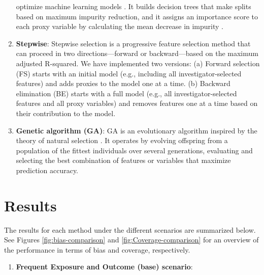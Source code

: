 \documentclass[sn-vancouver,Numbered,lineno,pdflatex]{sn-jnl}
\providecommand{\tightlist}{%
  \setlength{\itemsep}{0pt}\setlength{\parskip}{0pt}}
\begin{document}
\begin{enumerate}
  optimize machine learning models \citep{chen2016xgboost}. It builds
  decision trees that make splits based on maximum impurity reduction,
  and it assigns an importance score to each proxy variable by
  calculating the mean decrease in impurity
  \citep{xiao2024interpretable}.
\item
  \textbf{Stepwise}: Stepwise selection is a progressive feature
  selection method that can proceed in two directions---forward or
  backward---based on the maximum adjusted R-squared. We have
  implemented two versions: (a) Forward selection (FS) starts with an
  initial model (e.g., including all investigator-selected features) and
  adds proxies to the model one at a time. (b) Backward elimination (BE)
  starts with a full model (e.g., all investigator-selected features and
  all proxy variables) and removes features one at a time based on their
  contribution to the model.
\item
  \textbf{Genetic algorithm (GA)}: GA is an evolutionary algorithm
  inspired by the theory of natural selection
  \citep{holland1975adaptation}. It operates by evolving offspring from
  a population of the fittest individuals over several generations,
  evaluating and selecting the best combination of features or variables
  that maximize prediction accuracy.
\end{enumerate}

\section{Results}\label{results}

The results for each method under the different scenarios are summarized
below. See Figures \ref{fig:bias-comparison} and
\ref{fig:Coverage-comparison} for an overview of the performance in
terms of bias and coverage, respectively.

\begin{enumerate}
\def\labelenumi{(\roman{enumi})}
\tightlist
\item
  \textbf{Frequent Exposure and Outcome (base) scenario}:
\end{enumerate}
\end{document}
